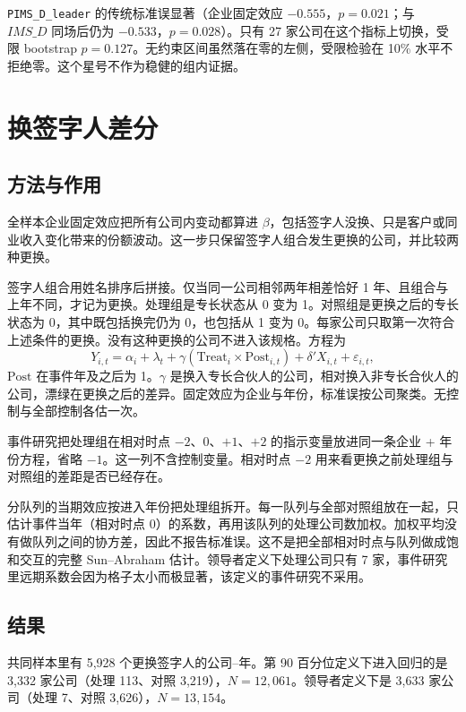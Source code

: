 \documentclass[11pt]{article}
\begin{document}
\texttt{PIMS\_D\_leader} 的传统标准误显著（企业固定效应 \(-0.555\)，\(p=0.021\)；与 \(IMS\_D\) 同场后仍为 \(-0.533\)，\(p=0.028\)）。只有 27 家公司在这个指标上切换，受限 bootstrap \(p=0.127\)。无约束区间虽然落在零的左侧，受限检验在 10\% 水平不拒绝零。这个星号不作为稳健的组内证据。

\section{换签字人差分}
\label{sec:did}

\subsection{方法与作用}

全样本企业固定效应把所有公司内变动都算进 \(\beta\)，包括签字人没换、只是客户或同业收入变化带来的份额波动。这一步只保留签字人组合发生更换的公司，并比较两种更换。

签字人组合用姓名排序后拼接。仅当同一公司相邻两年相差恰好 1 年、且组合与上年不同，才记为更换。处理组是专长状态从 0 变为 1。对照组是更换之后的专长状态为 0，其中既包括换完仍为 0，也包括从 1 变为 0。每家公司只取第一次符合上述条件的更换。没有这种更换的公司不进入该规格。方程为
\begin{equation}
Y_{i,t}=\alpha_i+\lambda_t+\gamma(\mathrm{Treat}_i\times\mathrm{Post}_{i,t})+\delta'X_{i,t}+\varepsilon_{i,t},
\label{eq:did}
\end{equation}
\(\mathrm{Post}\) 在事件年及之后为 1。\(\gamma\) 是换入专长合伙人的公司，相对换入非专长合伙人的公司，漂绿在更换之后的差异。固定效应为企业与年份，标准误按公司聚类。无控制与全部控制各估一次。

事件研究把处理组在相对时点 \(-2\)、\(0\)、\(+1\)、\(+2\) 的指示变量放进同一条企业 + 年份方程，省略 \(-1\)。这一列不含控制变量。相对时点 \(-2\) 用来看更换之前处理组与对照组的差距是否已经存在。

分队列的当期效应按进入年份把处理组拆开。每一队列与全部对照组放在一起，只估计事件当年（相对时点 0）的系数，再用该队列的处理公司数加权。加权平均没有做队列之间的协方差，因此不报告标准误。这不是把全部相对时点与队列做成饱和交互的完整 Sun--Abraham 估计。领导者定义下处理公司只有 7 家，事件研究里远期系数会因为格子太小而极显著，该定义的事件研究不采用。

\subsection{结果}

共同样本里有 5,928 个更换签字人的公司--年。第 90 百分位定义下进入回归的是 3,332 家公司（处理 113、对照 3,219），\(N=12{,}061\)。领导者定义下是 3,633 家公司（处理 7、对照 3,626），\(N=13{,}154\)。
\end{document}
